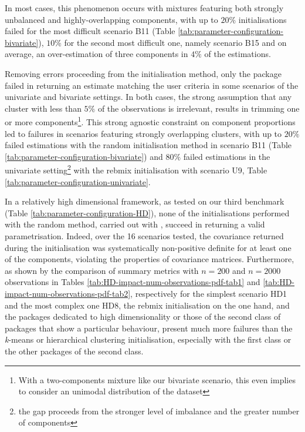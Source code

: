 In most cases, this phenomenon occurs with mixtures featuring both strongly unbalanced and highly-overlapping components, with up to \(20\%\) initialisations failed for the most difficult scenario B11 (Table \ref{tab:parameter-configuration-bivariate}), \(10\%\) for the second most difficult one, namely scenario B15 and on average, an over-estimation of three components in \(4\%\) of the estimations.

Removing errors proceeding from the initialisation method, only the  package failed in returning an estimate matching the user criteria in some scenarios of the univariate and bivariate settings. In both cases, the strong assumption that any cluster with less than \(5\%\) of the observations is irrelevant, results in trimming one or more components\footnote{With a two-components mixture like our bivariate scenario, this even implies to consider an unimodal distribution of the dataset}. This strong agnostic constraint on component proportions led to failures in scenarios featuring strongly overlapping clusters, with up to \(20\%\) failed estimations with the random initialisation method in scenario B11 (Table \ref{tab:parameter-configuration-bivariate}) and \(80\%\) failed estimations in the univariate setting\footnote{the gap proceeds from the stronger level of imbalance and the greater number of components} with the rebmix initialisation with scenario U9, Table \ref{tab:parameter-configuration-univariate}.

\color{blue}

In a relatively high dimensional framework, as tested on our third benchmark (Table \ref{tab:parameter-configuration-HD}), none of the initialisations performed with the random method, carried out with , succeed in returning a valid parametrisation. Indeed, over the 16 scenarios tested, the covariance returned during the initialisation was systematically non-positive definite for at least one of the components, violating the properties of covariance matrices.
Furthermore, as shown by the comparison of summary metrics with \(n=200\) and \(n=2000\) observations in Tables \ref{tab:HD-impact-num-observations-pdf-tab1}
and \ref{tab:HD-impact-num-observations-pdf-tab2}, respectively for the simplest scenario HD1 and the most complex one HD8, the rebmix initialisation on the one hand, and the packages dedicated to high dimensionality or those of the second class of packages that show a particular behaviour, present much more failures than the \emph{k}-means or hierarchical clustering initialisation, especially with the first class or the other packages of the second class.
\color{black}

